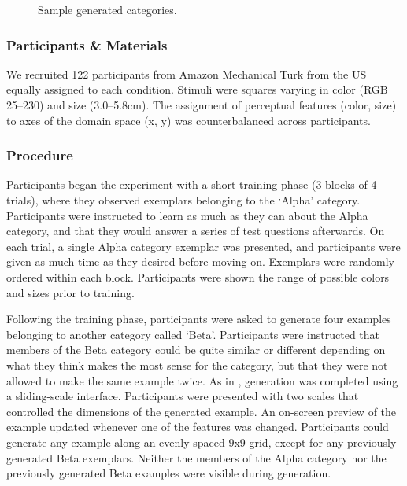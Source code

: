 \documentclass[10pt,letterpaper]{article}
\newcommand\inputpgf[2]{{
\let\pgfimageWithoutPath\pgfimage
\renewcommand{\pgfimage}[2][]{\pgfimageWithoutPath[##1]{#1/##2}}

}}
\begin{document}
\begin{figure}
    \begin{center}
    \inputpgf{figs/}{beta.samples.pgf}
    \caption{Sample generated categories. }
    \label{fig:beta.samples}
    \end{center}
\end{figure}

\subsubsection{Participants \& Materials}
We recruited 122 participants from Amazon Mechanical Turk from the US equally assigned to each condition. Stimuli were squares varying in color (RGB 25--230) and size (3.0--5.8cm). The assignment of perceptual features (color, size) to axes of the domain space (x, y) was counterbalanced across participants.


\subsubsection{Procedure}

Participants began the experiment with a short training phase (3 blocks of 4 trials), where they observed exemplars belonging to the `Alpha' category. Participants were instructed to learn as much as they can about the Alpha category, and that they would answer a series of test questions afterwards. On each trial, a single Alpha category exemplar was presented, and participants were given as much time as they desired before moving on. Exemplars were randomly ordered within each block. Participants were shown the range of possible colors and sizes prior to training.

Following the training phase, participants were asked to generate four examples belonging to another category called `Beta'. Participants were instructed that members of the Beta category could be quite similar or different depending on what they think makes the most sense for the category, but that they were not allowed to make the same example twice. As in \citet{jern2013probabilistic}, generation was completed using a sliding-scale interface. Participants were presented with two scales that controlled the dimensions of the generated example. An on-screen preview of the example updated whenever one of the features was changed. Participants could generate any example along an evenly-spaced 9x9 grid, except for any previously generated Beta exemplars. Neither the members of the Alpha category nor the previously generated Beta examples were visible during generation. 
\end{document}
